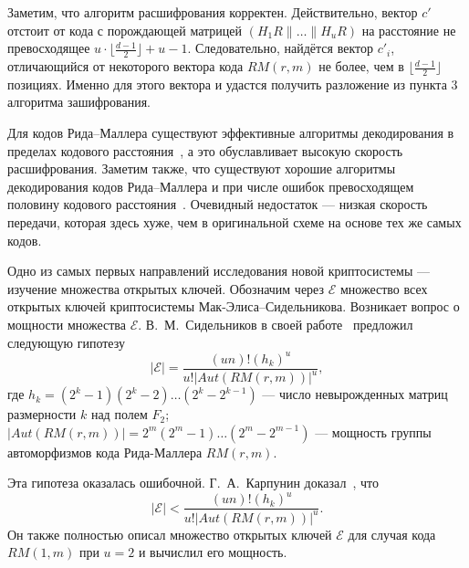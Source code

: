 Заметим, что алгоритм расшифрования корректен. Действительно,
вектор $c'$ отстоит от кода с порождающей
матрицей $(H_1R\|\ldots\|H_uR)$ на расстояние не превосходящее
$u\cdot\lfloor\frac{d-1}2\rfloor+u-1$. Следовательно, найдётся
вектор $c'_i$, отличающийся от некоторого вектора кода $RM(r,m)$
не более, чем в $\lfloor\frac{d-1}2\rfloor$ позициях. Именно для
этого вектора и удастся получить разложение из пункта 3 алгоритма
зашифрования.

Для кодов Рида--Маллера существуют эффективные алгоритмы
декодирования в пределах кодового расстояния~\cite{McWilliams}, а
это обуславливает высокую скорость расшифрования. Заметим также,
что существуют хорошие алгоритмы декодирования кодов Рида--Маллера
и при числе ошибок превосходящем половину кодового
расстояния~\cite{Sidelnikov2}. Очевидный недостаток
--- низкая скорость передачи, которая здесь хуже, чем в оригинальной схеме на
основе тех же самых кодов.

Одно из самых первых направлений исследования новой криптосистемы
--- изучение множества открытых ключей.
Обозначим через $\mathcal E$ множество всех открытых ключей
криптосистемы Мак-Элиса--Сидельникова. Возникает вопрос о мощности
множества $\mathcal E$. В.~М.~Сидельников в своей
работе~\cite{Sidelnikov1} предложил следующую гипотезу
$$|\mathcal E|=\frac{(un)!(h_k)^u}{u!|Aut(RM(r,m))|^u},$$
где $h_k=(2^k-1)(2^k-2)\ldots (2^k-2^{k-1})$ --- число
невырожденных матриц размерности $k$ над полем $F_2$;
$|Aut(RM(r,m))|=2^m(2^m-1)\ldots(2^m-2^{m-1})$
--- мощность группы автоморфизмов кода Рида-Маллера $RM(r,m)$.

Эта гипотеза оказалась ошибочной. Г.~А.~Карпунин
доказал~\cite{Karpunin}, что
$$|\mathcal E|<\frac{(un)!(h_k)^u}{u!|Aut(RM(r,m))|^u}.$$
Он также полностью описал множество открытых ключей $\mathcal E$
для случая кода $RM(1,m)$ при $u=2$ и вычислил его мощность.

